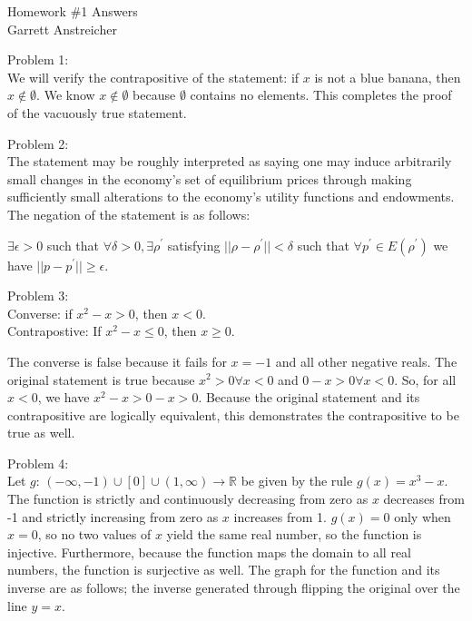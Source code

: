 \documentclass[12pt,leqno]{article}
\begin{document}
\begin{center}
\Large{Homework {\#}1 Answers}\\
\large{Garrett Anstreicher}
\end{center}

\bigskip

\noindent Problem 1:\\
\indent We will verify the contrapositive of the statement: if $x$ is not a blue banana, then $x \notin \emptyset$. We know $x \notin \emptyset$ because $\emptyset$ contains no elements. This completes the proof of the vacuously true statement.

\bigskip
\noindent Problem 2:\\
\indent The statement may be roughly interpreted as saying one may induce arbitrarily small changes in the economy's set of equilibrium prices through making sufficiently small alterations to the economy's utility functions and endowments. The negation of the statement is as follows:

\medskip
$\exists \epsilon > 0$ such that $\forall \delta > 0, \exists \rho^{\prime}$ satisfying $||\rho - \rho^{\prime}|| < \delta$ such that $\forall p^{\prime} \in E(\rho^{\prime})$ we have $||p - p^{\prime}|| \geq \epsilon$.

\bigskip
\noindent Problem 3:\\
\indent Converse: if $x^2 - x > 0$, then $x < 0$. \\
\indent Contrapostive: If $x^2 -x \leq 0$, then $x \geq 0$.

\medskip
\noindent The converse is false because it fails for $x=-1$ and all other negative reals. The original statement is true because $x^2>0 \forall x<0$ and $0-x> 0 \forall x<0$. So, for all $x<0$, we have $x^2-x > 0-x > 0$. Because the original statement and its contrapositive are logically equivalent, this demonstrates the contrapositive to be true as well.

\pagebreak
\bigskip
\noindent Problem 4:\\
\indent Let $g$: $(-\infty, -1) \cup [0] \cup (1, \infty) \rightarrow \mathds{R}$ be given by the rule $g(x) = x^3-x$. The function is strictly and continuously decreasing from zero as $x$ decreases from -1 and strictly increasing from zero as $x$ increases from 1. $g(x)= 0$ only when $x=0$, so no two values of $x$ yield the same real number, so the function is injective. Furthermore, because the function maps the domain to all real numbers, the function is surjective as well. The graph for the function and its inverse are as follows; the inverse generated through flipping the original over the line $y=x$. 
\end{document}
